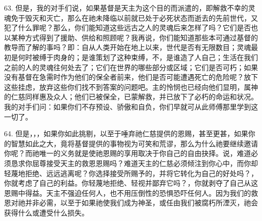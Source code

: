 63. 但是，我的对手们说，如果基督是天主为这个目的而派遣的，即解救不幸的灵魂免于毁灭和灭亡，那么在祂未降临以前就已处于必死状态而逝去的先前世代，又犯了什么罪呢？那么，你们能知道这些远古之人的灵魂后来怎样了吗？它们是否也以某种方式得到了援助、供给和照顾呢？我再说，你们能知道那些本可通过基督的教导而了解的事吗？即：自从人类开始在地上以来，世代是否有无限数目；灵魂最初是何时被缚于肉身的；是谁策划了这种束缚，不，是谁造了人自己；生活在我们之前的人的灵魂往何处去了；它们在世界的哪些部分或区域；它们是否可朽；如果没有基督在急需时作为他们的保全者前来，他们是否可能遭遇死亡的危险呢？放下这些挂虑，放弃这些你们找不到答案的问题吧。主的怜悯也已经向他们显明，属神的仁慈同样惠及众人；他们已被保全，已蒙解救，并已放下了必朽的命运和状况。我的对手们问：如果你们不存预设、骄傲和自负，你们早就可从此师傅那里学到这一切了。\par

64. 但是，，，如果你如此挑剔，以至于唾弃祂仁慈提供的恩赐，甚至更甚，如果你的智慧如此之大，竟将基督提供的事物视为可笑和荒谬，那么为什么祂要继续邀请你呢？而祂唯一的义务就是使祂恩赐的享用取决于你自己的自由抉择。说，难道必须恳求你屈尊接受天主的救恩恩赐吗？难道天主的仁慈必须倾注到你心中，而你却轻蔑地拒绝、远远逃离呢？你选择接受所赐予的，并将它转化为自己的好处吗？，你就考虑了自己的利益。你轻蔑地拒绝、轻视并鄙弃它吗？，你就剥夺了自己从这恩赐中得益。天主不强迫任何人，也不用压倒性的恐惧恐吓任何人。因为我们的救恩对祂并非必需，以至于如果祂使我们成为神圣，或任由我们被腐朽所湮灭，祂会获得什么或遭受什么损失。\par

